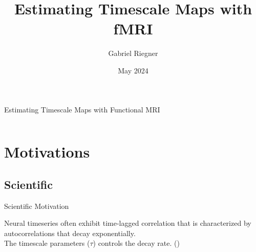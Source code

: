 \documentclass[12pt]{beamer}
\title{Estimating Timescale Maps with fMRI}
\author[]{Gabriel Riegner}
\date{May 2024}
\begin{document}
\begin{frame}{Estimating Timescale Maps with Functional MRI}
\small
\begin{columns}
\tableofcontents[hideallsubsections]
\end{columns}
\end{frame}


\section{Motivations}

\subsection{Scientific}
\begin{frame}{Scientific Motivation}
\footnotesize

Neural timeseries often exhibit time-lagged correlation that is characterized by autocorrelations that decay exponentially.\\
\vspace{.5cm}
The timescale parameters ($\tau$) controls the decay rate.
(\cite{gao_neuronal_2020})
\end{frame}
\end{document}
